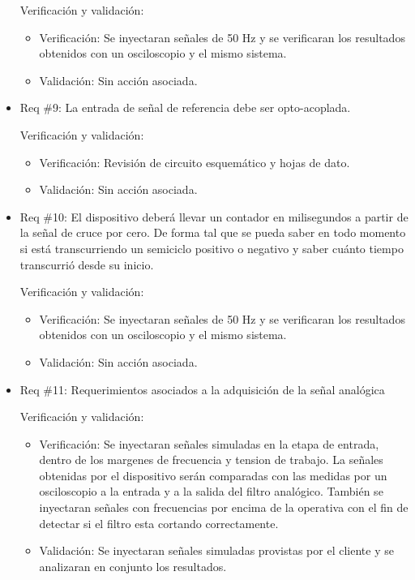 \documentclass[11pt]{charter}
\begin{document}
\begin{itemize}
Verificación y validación:

\begin{itemize}
\item Verificación: Se inyectaran señales de 50 Hz y se verificaran los resultados obtenidos con un osciloscopio y el mismo sistema.
\item Validación: Sin acción asociada.
\end{itemize}

\item Req \#9: La entrada de señal de referencia debe ser opto-acoplada.

Verificación y validación:

\begin{itemize}
\item Verificación: Revisión de circuito esquemático y hojas de dato.
\item Validación: Sin acción asociada. 
\end{itemize}

\item Req \#10: El dispositivo deberá llevar un contador en milisegundos a partir de la señal de cruce por cero. De forma tal que se pueda saber en todo momento si está transcurriendo un semiciclo positivo o negativo y saber cuánto tiempo transcurrió desde su inicio.

Verificación y validación:

\begin{itemize}
\item Verificación: Se inyectaran señales de 50 Hz y se verificaran los resultados obtenidos con un osciloscopio y el mismo sistema.
\item Validación: Sin acción asociada.
\end{itemize}

\item Req \#11: Requerimientos asociados a la adquisición de la señal analógica

Verificación y validación:

\begin{itemize}
\item Verificación: Se inyectaran señales simuladas en la etapa de entrada, dentro de los margenes de frecuencia y tension de trabajo. La señales obtenidas por el dispositivo serán comparadas con las medidas por un osciloscopio a la entrada y a la salida del filtro analógico. También se inyectaran señales con frecuencias por encima de la operativa con el fin de detectar si el filtro esta cortando correctamente.
\item Validación: Se inyectaran señales simuladas provistas por el cliente y se analizaran en conjunto los resultados.
\end{itemize}


\end{itemize}
\end{document}
